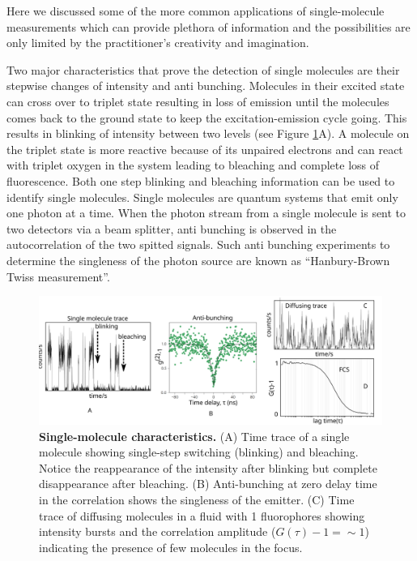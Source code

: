 Here we discussed some of the more common applications of single-molecule measurements which can provide plethora of information and the possibilities are only limited by the practitioner's creativity and imagination.

Two major characteristics that prove the detection of single molecules are their stepwise changes of intensity and anti bunching.\cite{rasnik2006nonblinking,basch1992photon}
Molecules in their excited state can cross over to triplet state resulting in loss of emission until the molecules comes back to the ground state to keep the excitation-emission cycle going.
This results in blinking of intensity between two levels (see Figure \ref{fig:SM_characteristics}A).
A molecule on the triplet state is more reactive because of its unpaired electrons and can react with triplet oxygen in the system leading to bleaching and complete loss of fluorescence.
Both one step blinking and bleaching information can be used to identify single molecules.
Single molecules are quantum systems that emit only one photon at a time.
When the photon stream from a single molecule is sent to two detectors via a beam splitter, anti bunching is observed in the autocorrelation of the two spitted signals.
Such anti bunching experiments to determine the singleness of the photon source are known as ``Hanbury-Brown Twiss  measurement''.\cite{brown1956correlation}
\begin{figure}
	\centering
	\includegraphics[width=\textwidth]{SM_characteristics}
	\caption{\textbf{Single-molecule characteristics.}
	(A) Time trace of a single molecule showing single-step switching (blinking) and bleaching.
	Notice the reappearance of the intensity after blinking but complete disappearance after bleaching.
	(B) Anti-bunching at zero delay time in the correlation shows the singleness of the emitter.\cite{chu2016a}
	(C) Time trace of diffusing molecules in a fluid with \SI{1}{\nM} fluorophores showing intensity bursts and the correlation amplitude ($G(\tau)-1={\sim}1$) indicating the presence of few molecules in the focus.}
	\label{fig:SM_characteristics}
\end{figure}

